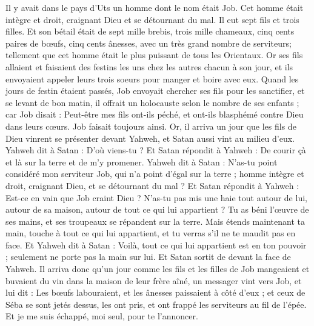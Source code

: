\begin{multicols}{2}
\VerseOne{}Il y avait dans le pays d'Uts un homme dont le nom était Job. Cet homme était intègre et droit, craignant Dieu et se détournant du mal.
Il eut sept fils et trois filles.
Et son bétail était de sept mille brebis, trois mille chameaux, cinq cents paires de bœufs, cinq cents ânesses, avec un très grand nombre de serviteurs; tellement que cet homme était le plus puissant de tous les Orientaux.
Or ses fils allaient et faisaient des festins les uns chez les autres chacun à son jour, et ils envoyaient appeler leurs trois soeurs pour manger et boire avec eux.
Quand les jours de festin étaient passés, Job envoyait chercher ses fils pour les sanctifier, et se levant de bon matin, il offrait un holocauste selon le nombre de ses enfants ; car Job disait : Peut-être mes fils ont-ils péché, et ont-ils blasphémé contre Dieu dans leurs cœurs. Job faisait toujours ainsi.
Or, il arriva un jour que les fils de Dieu vinrent se présenter devant Yahweh, et Satan aussi vint au milieu d'eux.
Yahweh dit à Satan : D'où viens-tu ? Et Satan répondit à Yahweh : De courir çà et là sur la terre et de m'y promener.
Yahweh dit à Satan : N'as-tu point considéré mon serviteur Job, qui n'a point d'égal sur la terre ; homme intègre et droit, craignant Dieu, et se détournant du mal ?
Et Satan répondit à Yahweh : Est-ce en vain que Job craint Dieu ?
N'as-tu pas mis une haie  tout autour de lui, autour de sa maison, autour de tout ce qui lui appartient ? Tu as béni l'œuvre de ses mains, et ses troupeaux se répandent sur la terre.
Mais étends maintenant ta main, touche à tout ce qui lui appartient, et tu verras s'il ne te maudit pas en face.
Et Yahweh dit à Satan : Voilà, tout ce qui lui appartient est en ton pouvoir ; seulement ne porte pas la main sur lui. Et Satan sortit de devant la face de Yahweh.
Il arriva donc qu'un jour comme les fils et les filles de Job mangeaient et buvaient du vin dans la maison de leur frère aîné, un messager vint vers Job,
et lui dit : Les bœufs labouraient, et les ânesses paissaient à côté d'eux ;
et ceux de Séba se sont jetés dessus, les ont pris, et ont frappé les serviteurs au fil de l'épée. Et je me suis échappé, moi seul, pour te l'annoncer.

\end{multicols}
